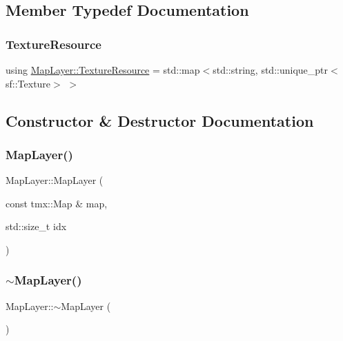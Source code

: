 \subsection{Member Typedef Documentation}
\mbox{\label{classMapLayer_a64011087426e436e3cb8374570378d68}} 
\subsubsection{\texorpdfstring{Texture\+Resource}{TextureResource}}
{\footnotesize\ttfamily using \hyperlink{classMapLayer_a64011087426e436e3cb8374570378d68}{Map\+Layer\+::\+Texture\+Resource} =  std\+::map$<$std\+::string, std\+::unique\+\_\+ptr$<$sf\+::\+Texture$>$ $>$\hspace{0.3cm}{\ttfamily [private]}}



\subsection{Constructor \& Destructor Documentation}
\mbox{\label{classMapLayer_ac1b9f1e3ba6d800abf508fa11490187b}} 
\subsubsection{\texorpdfstring{Map\+Layer()}{MapLayer()}\hspace{0.1cm}{\footnotesize\ttfamily [1/2]}}
{\footnotesize\ttfamily Map\+Layer\+::\+Map\+Layer (\begin{DoxyParamCaption}\item[{const tmx\+::\+Map \&}]{map,  }\item[{std\+::size\+\_\+t}]{idx }\end{DoxyParamCaption})\hspace{0.3cm}{\ttfamily [inline]}}

\mbox{\label{classMapLayer_a79858f9ee05242aa47ac680940e5ea74}} 
\subsubsection{\texorpdfstring{$\sim$\+Map\+Layer()}{~MapLayer()}}
{\footnotesize\ttfamily Map\+Layer\+::$\sim$\+Map\+Layer (\begin{DoxyParamCaption}{ }\end{DoxyParamCaption})\hspace{0.3cm}{\ttfamily [default]}}

